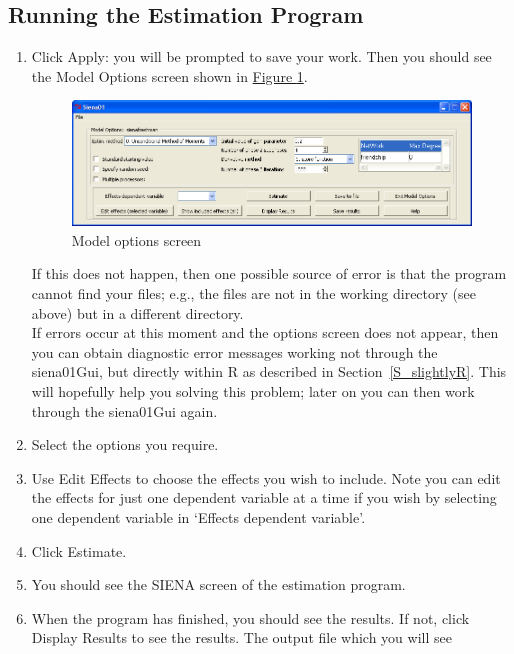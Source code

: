 \documentclass[a4paper,fleqn]{article}
\newcommand{\+}{\, + \,}
\newcommand{\sfn}[1]{\textsf{#1}}
\newcommand{\R}{{\sf R }}
\newcommand{\SI}{{\sf SIENA }}
\begin{document}
{\subsection{Running the Estimation Program}
\label{estgui}
\begin{enumerate}
\item Click \sfn{Apply}: you will be prompted to save your work. Then you should
  see the \sfn{Model Options} screen shown in \hyperlink{options}{Figure
    \ref{fig:options}}.
  \begin{figure}[ht]
      \hypertarget{options}{}
    \begin{center}
      \includegraphics[width=\textwidth]{siena3.png}
    \end{center}
\caption{Model options screen}
\label{fig:options}
  \end{figure}
    If this does not happen, then one possible source of error is that the
    program cannot find your files; e.g.,
    the files are not in the working directory (see above) but in a different
    directory.\\
    If errors occur at this moment and the options screen does not appear,
    then you can obtain diagnostic error messages
    working not through the \sfn{siena01Gui}, but directly  within \R
    as described in Section~\ref{S_slightlyR}.
    This will hopefully help you solving this problem; later on
    you can then work through the \sfn{siena01Gui} again.
\item Select the options you require.
\item Use \sfn{Edit Effects} to choose the effects you wish to include. Note you
  can edit the effects for just one dependent variable at a time if you wish
  by selecting one dependent variable in `Effects dependent variable'.
\item Click \sfn{Estimate}.
\item You should see the \SI screen of the estimation program.
\item When the program has finished, you should see the results. If not, click
  \sfn{Display Results} to see the results.  The output file which you will see

\end{enumerate}}
\end{document}
